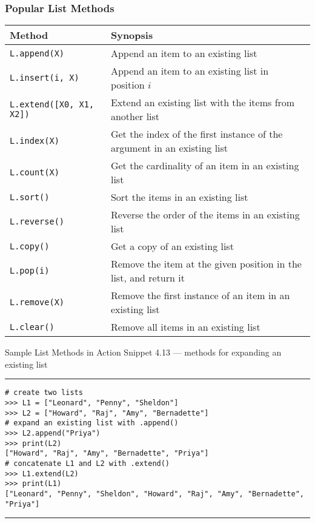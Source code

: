 \documentclass[aspectratio=1610]{beamer}
\begin{document}
\begin{frame}
    \frametitle{Popular List Methods}
    \begin{table}[!htbp]
    	\centering
        \small
    	\begin{tabular}{lp{10cm}}
    		\toprule \toprule
    		Method & Synopsis \\
    		\midrule 
    		\texttt{L.append(X)} & Append an item to an existing list\\
    		\texttt{L.insert(i, X)} & Append an item to an existing list in position $i$ \\
    		\texttt{L.extend([X0, X1, X2])} & Extend an existing list with the items from another list\\
    		\texttt{L.index(X)} & Get the index of the first instance of the argument in an existing list\\
    		\texttt{L.count(X)} & Get the cardinality of an item in an existing list\\
    		\texttt{L.sort()} & Sort the items in an existing list\\
    		\texttt{L.reverse()} & Reverse the order of the items in an existing list\\
    		\texttt{L.copy()} & Get a copy of an existing list\\
    		\texttt{L.pop(i)} & Remove the item at the given position in the list, and return it\\
    		\texttt{L.remove(X)} & Remove the first instance of an item in an existing list\\
    		\texttt{L.clear()} & Remove all items in an existing list\\
    		\bottomrule 
    	\end{tabular}
    \end{table}
\end{frame}

\begin{frame}[fragile]{Sample List Methods in Action}
    Snippet 4.13 --- methods for expanding an existing list
    \rule{\textwidth}{1pt}
    \scriptsize
    \begin{verbatim}
# create two lists 
>>> L1 = ["Leonard", "Penny", "Sheldon"]
>>> L2 = ["Howard", "Raj", "Amy", "Bernadette"]
# expand an existing list with .append()
>>> L2.append("Priya") 
>>> print(L2)
["Howard", "Raj", "Amy", "Bernadette", "Priya"]
# concatenate L1 and L2 with .extend()
>>> L1.extend(L2)
>>> print(L1)
["Leonard", "Penny", "Sheldon", "Howard", "Raj", "Amy", "Bernadette", "Priya"]
    \end{verbatim}
    \rule{\textwidth}{1pt}
\end{frame}
\end{document}
